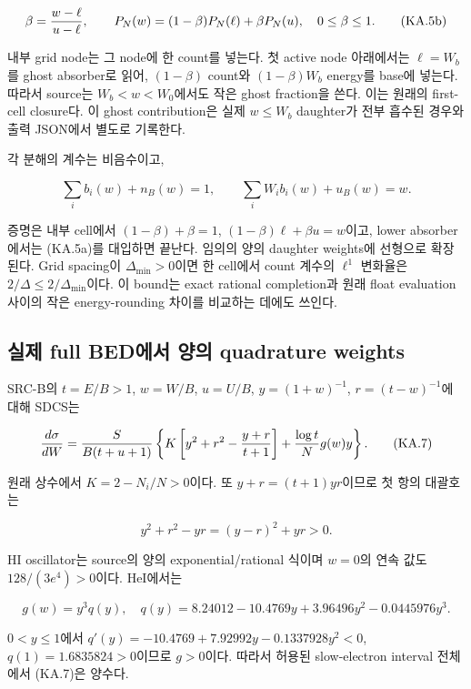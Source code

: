 \[
 \beta={w-\ell\over u-\ell},\qquad
 P_N(w)=(1-\beta)P_N(\ell)+\beta P_N(u),\quad0\le\beta\le1.
 \tag{KA.5b}
\]

내부 grid node는 그 node에 한 count를 넣는다. 첫 active node 아래에서는 \(\ell=W_b\)를 ghost absorber로 읽어, \((1-\beta)\) count와 \((1-\beta)W_b\) energy를 base에 넣는다. 따라서 source는 \(W_b<w<W_0\)에서도 작은 ghost fraction을 쓴다. 이는 원래의 first-cell closure다. 이 ghost contribution은 실제 \(w\le W_b\) daughter가 전부 흡수된 경우와 출력 JSON에서 별도로 기록한다.

각 분해의 계수는 비음수이고,

\[
 \sum_i b_i(w)+n_B(w)=1,\qquad
 \sum_iW_i b_i(w)+u_B(w)=w.
 \tag{KA.6}
\]

증명은 내부 cell에서 \((1-\beta)+\beta=1\), \((1-\beta)\ell+\beta u=w\)이고, lower absorber에서는 (KA.5a)를 대입하면 끝난다. 임의의 양의 daughter weights에 선형으로 확장된다. Grid spacing이 \(\Delta_{\min}>0\)이면 한 cell에서 count 계수의 \(\ell^1\) 변화율은 \(2/\Delta\le2/\Delta_{\min}\)이다. 이 bound는 exact rational completion과 원래 float evaluation 사이의 작은 energy-rounding 차이를 비교하는 데에도 쓰인다.

\hypertarget{uxc2e4uxc81c-full-beduxc5d0uxc11c-uxc591uxc758-quadrature-weights}{%
\subsection{실제 full BED에서 양의 quadrature weights}\label{uxc2e4uxc81c-full-beduxc5d0uxc11c-uxc591uxc758-quadrature-weights}}

SRC-B의 \(t=E/B>1\), \(w=W/B\), \(u=U/B\), \(y=(1+w)^{-1}\), \(r=(t-w)^{-1}\)에 대해 SDCS는

\[
 {d\sigma\over dW}={S\over B(t+u+1)}
 \left\{K\left[y^2+r^2-{y+r\over t+1}\right]
                  +{\log t\over N}g(w)y\right\}.
 \tag{KA.7}
\]

원래 상수에서 \(K=2-N_i/N>0\)이다. 또 \(y+r=(t+1)yr\)이므로 첫 항의 대괄호는

\[
 y^2+r^2-yr=(y-r)^2+yr>0.
 \tag{KA.8}
\]

HI oscillator는 source의 양의 exponential/rational 식이며 \(w=0\)의 연속 값도 \(128/(3e^4)>0\)이다. HeI에서는

\[
 g(w)=y^3 q(y),\quad q(y)=8.24012-10.4769y+3.96496y^2-0.0445976y^3.
 \tag{KA.9}
\]

\(0<y\le1\)에서 \(q'(y)=-10.4769+7.92992y-0.1337928y^2<0\), \(q(1)=1.6835824>0\)이므로 \(g>0\)이다. 따라서 허용된 slow-electron interval 전체에서 (KA.7)은 양수다.

